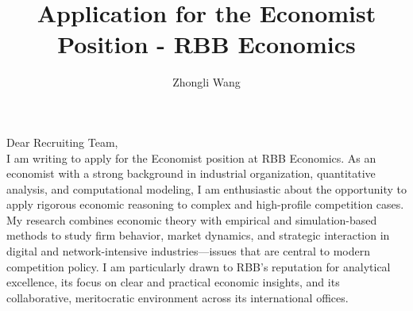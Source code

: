 \documentclass{nfr}
\title{Application for the Economist Position - RBB Economics}
\author{Zhongli Wang}
\begin{document}

% 
% 
% 
% 


\maketitle


\noindent Dear Recruiting Team,\\[0.2cm]

I am writing to apply for the Economist position at RBB Economics. 
As an economist with a strong background in industrial organization, quantitative analysis, and computational modeling, I am enthusiastic about the opportunity to apply rigorous economic reasoning to complex and high-profile competition cases. 
My research combines economic theory with empirical and simulation-based methods to study firm behavior, market dynamics, and strategic interaction in digital and network-intensive industries—issues that are central to modern competition policy. 
I am particularly drawn to RBB’s reputation for analytical excellence, its focus on clear and practical economic insights, and its collaborative, meritocratic environment across its international offices.\\
\end{document}
